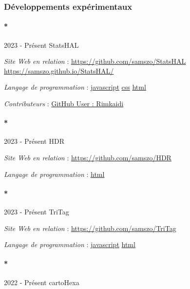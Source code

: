 \documentclass[
  a4paper,
  DIV=11,
  numbers=noendperiod]{scrreprt}
\let\oldparagraph\paragraph
\renewcommand{\paragraph}[1]{\oldparagraph{#1}\mbox{}}
\begin{document}
\subsubsection{Développements expérimentaux}\label{sec-item301732}

\paragraph*{2023 - Présent StatsHAL}\label{sec-item301891}

\emph{Site Web en relation} : \url{https://github.com/samszo/StatsHAL}
\url{https://samszo.github.io/StatsHAL/}

\emph{Langage de programmation} :
\href{http://localhost/samszo/omk/s/fiches/item/89711}{javascript}
\href{http://localhost/samszo/omk/s/fiches/item/102418}{css}
\href{http://localhost/samszo/omk/s/fiches/item/96621}{html}

\emph{Contributeurs} :
\href{http://localhost/samszo/omk/s/fiches/item/300829}{GitHub User :
Rimkaidi}

\paragraph*{2023 - Présent HDR}\label{sec-item301892}

\emph{Site Web en relation} : \url{https://github.com/samszo/HDR}

\emph{Langage de programmation} :
\href{http://localhost/samszo/omk/s/fiches/item/96621}{html}

\paragraph*{2023 - Présent TriTag}\label{sec-item301890}

\emph{Site Web en relation} : \url{https://github.com/samszo/TriTag}

\emph{Langage de programmation} :
\href{http://localhost/samszo/omk/s/fiches/item/89711}{javascript}
\href{http://localhost/samszo/omk/s/fiches/item/96621}{html}

\paragraph*{2022 - Présent cartoHexa}\label{sec-item301875}
\end{document}
